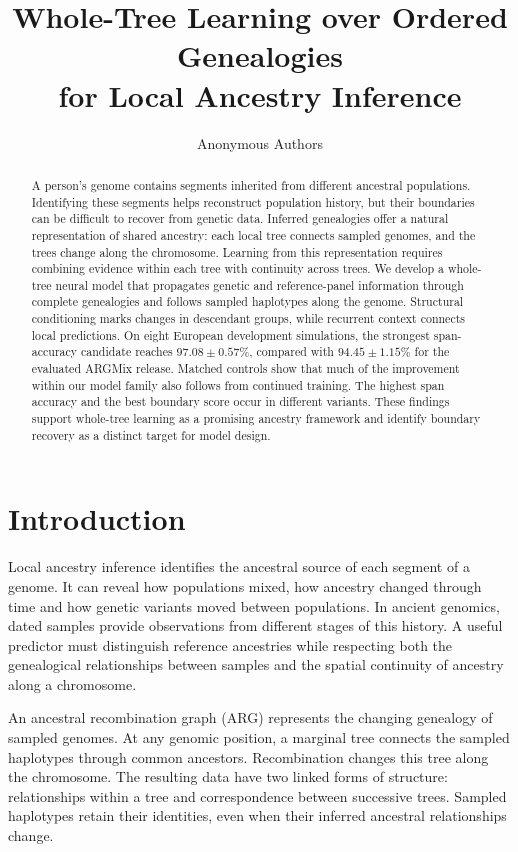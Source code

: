 \documentclass[letterpaper]{article}
\title{Whole-Tree Learning over Ordered Genealogies\\for Local Ancestry Inference}
\author{Anonymous Authors}
\begin{document}
\maketitle

\begin{abstract}
A person's genome contains segments inherited from different ancestral populations. Identifying these segments helps reconstruct population history, but their boundaries can be difficult to recover from genetic data. Inferred genealogies offer a natural representation of shared ancestry: each local tree connects sampled genomes, and the trees change along the chromosome. Learning from this representation requires combining evidence within each tree with continuity across trees. We develop a whole-tree neural model that propagates genetic and reference-panel information through complete genealogies and follows sampled haplotypes along the genome. Structural conditioning marks changes in descendant groups, while recurrent context connects local predictions. On eight European development simulations, the strongest span-accuracy candidate reaches $97.08\pm0.57\%$, compared with $94.45\pm1.15\%$ for the evaluated ARGMix release. Matched controls show that much of the improvement within our model family also follows from continued training. The highest span accuracy and the best boundary score occur in different variants. These findings support whole-tree learning as a promising ancestry framework and identify boundary recovery as a distinct target for model design.
\end{abstract}

\section{Introduction}
Local ancestry inference identifies the ancestral source of each segment of a genome. It can reveal how populations mixed, how ancestry changed through time and how genetic variants moved between populations. In ancient genomics, dated samples provide observations from different stages of this history. A useful predictor must distinguish reference ancestries while respecting both the genealogical relationships between samples and the spatial continuity of ancestry along a chromosome.

An ancestral recombination graph (ARG) represents the changing genealogy of sampled genomes. At any genomic position, a marginal tree connects the sampled haplotypes through common ancestors. Recombination changes this tree along the chromosome. The resulting data have two linked forms of structure: relationships within a tree and correspondence between successive trees. Sampled haplotypes retain their identities, even when their inferred ancestral relationships change.
\end{document}

